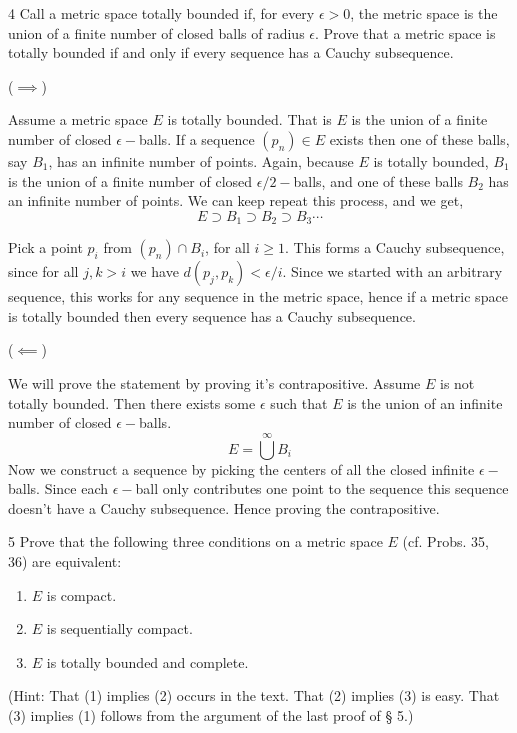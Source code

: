 \documentclass[12pt]{article}
\begin{document}
\newpage 

\begin{problem}{4}
    Call a metric space totally bounded if, for every $\epsilon > 0$, the metric space is the union of a finite number of closed balls of radius $\epsilon$. Prove that a metric space is totally bounded if and only if every sequence has a Cauchy subsequence.
\end{problem}

\begin{solution}
    \bbni

    ($\implies$)

    Assume a metric space $E$ is totally bounded. That is $E$ is the union of a finite number of closed $\epsilon-$balls. If a sequence $(p_n) \in E$ exists then one of these balls, say $B_1$, has an infinite number of points. Again, because $E$ is totally bounded, $B_1$ is the union of a finite number of closed $\epsilon/2-$balls, and one of these balls $B_2$ has an infinite number of points. We can keep repeat this process, and we get, 
    \[E \supset B_1 \supset B_2 \supset B_3 \cdots\]

    Pick a point $p_i$ from $(p_n) \cap B_i$, for all $i \geq 1$. This forms a Cauchy subsequence, since for all $j, k > i$ we have $d(p_j, p_k) < \epsilon/i$. 
    Since we started with an arbitrary sequence, this works for any sequence in the metric space, hence if a metric space is totally bounded then every sequence has a Cauchy subsequence. 
      
    ($\impliedby$)

    We will prove the statement by proving it's contrapositive. Assume $E$ is not totally bounded. Then there exists some $\epsilon$ such that $E$ is the union of an infinite number of closed $\epsilon-$balls.  
    \[E = \overset{\infty}{\bigcup}B_i\]
    Now we construct a sequence by picking the centers of all the closed infinite $\epsilon-$balls. Since each $\epsilon-$ball only contributes one point to the sequence this sequence doesn't have a Cauchy subsequence. Hence proving the contrapositive. 
\end{solution}

\newpage 

\begin{problem}{5}
     Prove that the following three conditions on a metric space $E$ (cf. Probs. 35, 36) are equivalent:
     \begin{enumerate}
        \item $E$ is compact.
        \item $E$ is sequentially compact.
        \item $E$ is totally bounded and complete.
     \end{enumerate}
     (Hint: That (1) implies (2) occurs in the text. That (2) implies (3) is easy. That (3) implies (1) follows from the argument of  the last proof of § 5.)
\end{problem}
\end{document}
